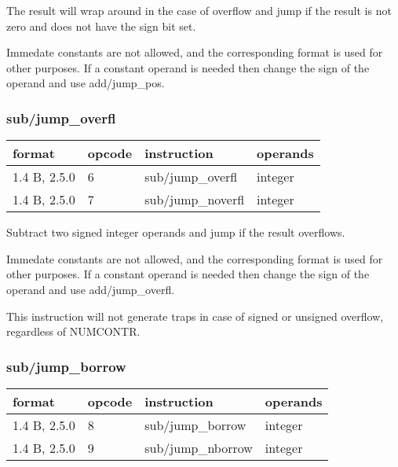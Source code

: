 \documentclass[forwardcom.tex]{subfiles}
\begin{document}
The result will wrap around in the case of overflow and jump if the result is not zero and does not have the sign bit set.
\vspace{2mm}

Immedate constants are not allowed, and the corresponding format is used for other purposes.
If a constant operand is needed then change the sign of the operand and use add/jump\_pos. 

\subsubsection{sub/jump\_overfl}
\label{table:subJumpOverflInstruction}
\begin{tabular}{|p{20mm}|p{12mm}|p{56mm}|p{50mm}|}
\hline
\bfseries format & \bfseries opcode & \bfseries instruction & \bfseries operands \\ \hline
1.4 B, 2.5.0 &  6 & sub/jump\_overfl & integer \\ \hline
1.4 B, 2.5.0 &  7 & sub/jump\_noverfl & integer\\ \hline
\end{tabular}
\vspace{2mm}

Subtract two signed integer operands and jump if the result overflows.
\vspace{2mm}

Immedate constants are not allowed, and the corresponding format is used for other purposes.
If a constant operand is needed then change the sign of the operand and use add/jump\_overfl. 
\vspace{2mm}

This instruction will not generate traps in case of signed or unsigned overflow, regardless of  NUMCONTR.
\vspace{2mm}

\subsubsection{sub/jump\_borrow}
\label{table:subJumpBorrowInstruction}
\begin{tabular}{|p{20mm}|p{12mm}|p{56mm}|p{50mm}|}
\hline
\bfseries format & \bfseries opcode & \bfseries instruction & \bfseries operands \\ \hline
1.4 B, 2.5.0 &  8 & sub/jump\_borrow & integer \\ \hline
1.4 B, 2.5.0 &  9 & sub/jump\_nborrow & integer\\ \hline
\end{tabular}
\vspace{2mm}
\end{document}
